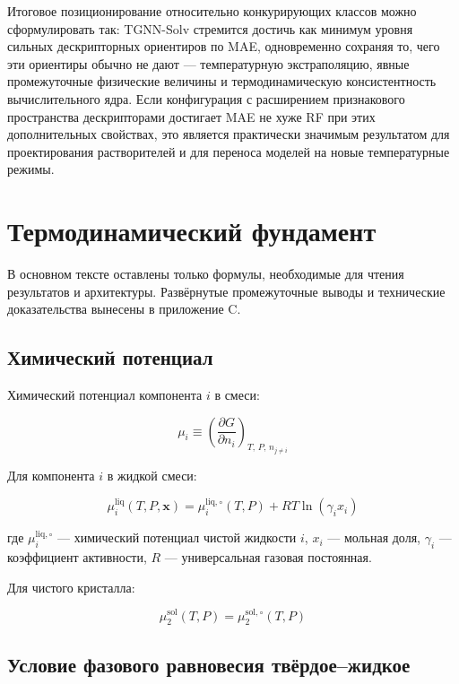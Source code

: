 \documentclass[11pt]{article}
\begin{document}
Итоговое позиционирование относительно конкурирующих классов можно сформулировать так: TGNN-Solv стремится достичь как минимум уровня сильных дескрипторных ориентиров по MAE, одновременно сохраняя то, чего эти ориентиры обычно не дают --- температурную экстраполяцию, явные промежуточные физические величины и термодинамическую консистентность вычислительного ядра. Если конфигурация с расширением признакового пространства дескрипторами достигает MAE не хуже RF при этих дополнительных свойствах, это является практически значимым результатом для проектирования растворителей и для переноса моделей на новые температурные режимы.
\section{Термодинамический фундамент}

В основном тексте оставлены только формулы, необходимые для чтения результатов и архитектуры. Развёрнутые промежуточные выводы и технические доказательства вынесены в приложение C.

\subsection{Химический потенциал}

Химический потенциал компонента $i$ в смеси:

\begin{equation*}
\mu_i \equiv \left(\frac{\partial G}{\partial n_i}\right)_{T,\, P,\, n_{j \neq i}}
\end{equation*}

Для компонента $i$ в жидкой смеси:

\begin{equation*}
\mu_i^{\mathrm{liq}}(T, P, \mathbf{x}) = \mu_i^{\mathrm{liq},\circ}(T, P) + RT \ln(\gamma_i x_i)
\end{equation*}

где $\mu_i^{\mathrm{liq},\circ}$ --- химический потенциал чистой жидкости $i$, $x_i$ --- мольная доля, $\gamma_i$ --- коэффициент активности, $R$ --- универсальная газовая постоянная.

Для чистого кристалла:

\begin{equation*}
\mu_2^{\mathrm{sol}}(T, P) = \mu_2^{\mathrm{sol},\circ}(T, P)
\end{equation*}

\subsection{Условие фазового равновесия твёрдое--жидкое}
\end{document}
